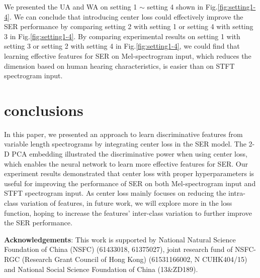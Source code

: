 \documentclass{article}
\begin{document}
We presented the UA and WA on setting 1 $\sim$ setting 4 shown in Fig.\ref{fig:setting1-4}. We can conclude that introducing center loss could effectively improve the SER performance by comparing setting 2 with setting 1 or setting 4 with setting 3 in Fig.\ref{fig:setting1-4}.  By comparing experimental results on setting 1 with setting 3 or setting 2 with setting 4 in Fig.\ref{fig:setting1-4}, we could find that learning effective features for SER on Mel-spectrogram input, which reduces the dimension based on human hearing characteristics, is easier than on STFT spectrogram input.

\section{conclusions}
In this paper, we presented an approach to learn discriminative features from variable length spectrograms by integrating center loss in the SER model. The 2-D PCA embedding illustrated the discriminative power when using center loss, which enables the neural network to learn more effective features for SER. Our experiment results demonstrated that center loss with proper hyperparameters is useful for improving the performance of SER on both Mel-spectrogram input and STFT spectrogram input. As center loss mainly focuses on reducing the intra-class variation of features, in future work, we will explore more in the loss function, hoping to increase the features' inter-class variation to further improve the SER performance. 

\vfill

\noindent \small \textbf{Acknowledgements}: This work is supported by National Natural Science Foundation of China (NSFC) (61433018, 61375027), joint research fund of NSFC-RGC (Research Grant Council of Hong Kong) (61531166002, N CUHK404/15) and National Social Science Foundation of China (13\&ZD189).
\pagebreak
								




\end{document}
